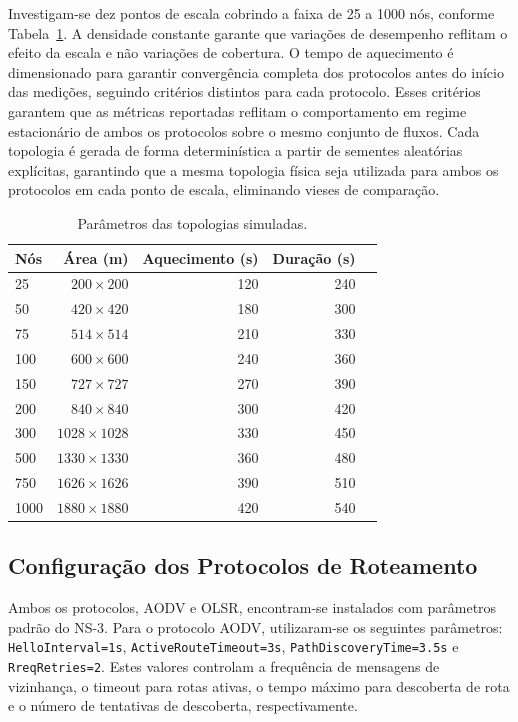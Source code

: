 \documentclass[12pt]{article}
\begin{document}
Investigam-se dez pontos de escala cobrindo a faixa de 25 a 1000 nós, conforme Tabela~\ref{tab:topologias}. A densidade constante garante que variações de desempenho reflitam o efeito da escala e não variações de cobertura. O tempo de aquecimento é dimensionado para garantir convergência completa dos protocolos antes do início das medições, seguindo critérios distintos para cada protocolo. Esses critérios garantem que as métricas reportadas reflitam o comportamento em regime estacionário de ambos os protocolos sobre o mesmo conjunto de fluxos. Cada topologia é gerada de forma determinística a partir de sementes aleatórias explícitas, garantindo que a mesma topologia física seja utilizada para ambos os protocolos em cada ponto de escala, eliminando vieses de comparação.

\begin{table}[h]
\centering
\caption{Parâmetros das topologias simuladas.}
\label{tab:topologias}
\begin{tabular}{lrrrr}
\hline
\textbf{Nós} & \textbf{Área (m)} & \textbf{Aquecimento (s)} & \textbf{Duração (s)} \\
\hline
25 & $200 \times 200$   & 120 & 240 \\
50 & $420 \times 420$   & 180 & 300 \\
75 & $514 \times 514$   & 210 & 330 \\
100 & $600 \times 600$   & 240 & 360 \\
150 & $727 \times 727$   & 270 & 390 \\
200 & $840 \times 840$   & 300 & 420 \\
300 & $1028 \times 1028$ & 330 & 450 \\
500 & $1330 \times 1330$ & 360 & 480 \\
750 & $1626 \times 1626$ & 390 & 510 \\
1000 & $1880 \times 1880$ & 420 & 540 \\
\hline
\end{tabular}
\end{table}

\subsection{Configuração dos Protocolos de Roteamento}

Ambos os protocolos, AODV e OLSR, encontram-se instalados com parâmetros padrão do NS-3. Para o protocolo AODV, utilizaram-se os seguintes parâmetros: \texttt{HelloInterval=1s}, \texttt{ActiveRouteTimeout=3s}, \texttt{PathDiscoveryTime=3.5s} e \texttt{RreqRetries=2}. Estes valores controlam a frequência de mensagens de vizinhança, o timeout para rotas ativas, o tempo máximo para descoberta de rota e o número de tentativas de descoberta, respectivamente.
\end{document}
